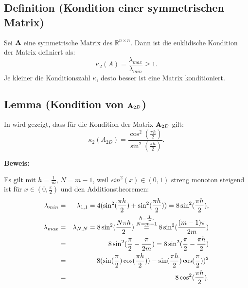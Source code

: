 \subsection{Definition (Kondition einer symmetrischen Matrix)}\label{ss.Definition Kondition einer Matrix}

Sei ${\textbf{A}}$ eine symmetrische Matrix des $\mathbb{R}^{n \times n}$. Dann ist die euklidische Kondition der Matrix definiert als:
\begin{equation}
\kappa_{2} (A) = \frac {\lambda_{max}} {\lambda_{min}} \ge 1.\label{eq.Kondition}
\end{equation}
Je kleiner die Konditionszahl $\kappa$, desto besser ist eine Matrix konditioniert.

\subsection{Lemma (Kondition von ${\textbf{A}}_{2D}$)}\label{ss.Matrixkondition}

In \cite{DR2} wird gezeigt, dass für die Kondition der Matrix ${\textbf{A}}_{2D}$ gilt:
\begin{equation}
\kappa_{2} (A_{2D}) = \frac {\cos^{2}(\frac{\pi h}{2})} {\sin^{2}(\frac{\pi h}{2})}.
\end{equation}

\textbf{Beweis:}

Es gilt mit $h = \frac{1}{m}$, $N = m - 1$, weil $sin^{2}(x) \in (0,1)$ streng monoton steigend ist für $x \in (0,\frac{\pi}{2})$ und den Additionstheoremen:
\begin{eqnarray}
\lambda_{min} &=& \lambda_{1,1} = 4 (\sin^{2}(\frac{\pi h}{2}) + \sin^{2}(\frac{\pi h}{2})) = 8\sin^{2}(\frac{\pi h}{2}),\label{eq.Lambda min}\\
\lambda_{max} &=& \lambda_{N,N} = 8\sin^{2}(\frac{N\pi h}{2}) \overset{\substack{h=\frac {1} {m}, \\N=m-1}}{=} 8\sin^{2}(\frac{(m-1)\pi}{2m}) \notag \\
&=& 8\sin^{2}(\frac{\pi}{2} - \frac{\pi}{2m}) = 8\sin^{2}(\frac{\pi}{2} - \frac{\pi h}{2}) \notag \\
&=& 8(\sin(\frac{\pi}{2})\cos(\frac{\pi h}{2})) - \sin(\frac{\pi h}{2})\cos(\frac{\pi}{2}))^{2} \notag \\
&=& 8\cos^{2}(\frac{\pi h}{2}). \label{eq.Lambda max}
\end{eqnarray}

